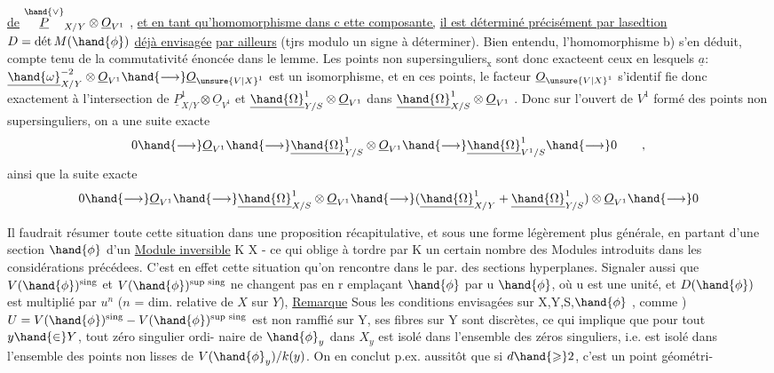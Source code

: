 
\uline{de} $\overset{\hand{\vee}}{\underline{P}}_{X/Y}\otimes\underline{O}_{V^1}$ , \uline{et en tant qu'homomorphisme dans c ette composante,}
\uline{il est déterminé précisément par lasedtion} $D = \text{dét}\,M(\hand{\phi})$ \uline{déjà envisagée}
\uline{par ailleurs} (tjrs modulo un signe à déterminer). Bien entendu,
l'homomorphisme b) s'en déduit, compte tenu de la commutativité énoncée
dans le lemme. Les points non supersinguliers$_{\text{x}}$ sont donc exacteent
ceux en lesquels $\underline{a}$: $\underline{\hand{\omega}}^{-2}_{X/Y}\otimes\underline{O}_{V^1}\hand{\longrightarrow}\underline{O}_{\unsure{V|X}^1}$ est un isomorphisme, et en
ces points,  le facteur $\underline{O}_{\unsure{V|X}^1}$ s'identif
fie donc exactement à l'intersection de $\underline{P}^1_{X/Y}\otimes\underline{O}_{V^1}$ et $\underline{\hand{\Omega}}^1_{Y/S}\otimes\underline{O}_{V^1}$
dans $\underline{\hand{\Omega}}^1_{X/S}\otimes\underline{O}_{V^1}$ . Donc sur l'ouvert de $V^1$ formé des points non
supersinguliers, on a une suite exacte
\[ 0\hand{\longrightarrow}\underline{O}_{V^1}\hand{\longrightarrow}\underline{\hand{\Omega}}^1_{Y/S}\otimes\underline{O}_{V^1}\hand{\longrightarrow}\underline{\hand{\Omega}}^1_{V^1/S}\hand{\longrightarrow} 0 \qquad , \]
ainsi que la suite exacte
\[ 0\hand{\longrightarrow}\underline{O}_{V^1}\hand{\longrightarrow}\underline{\hand{\Omega}}^1_{X/S}\otimes\underline{O}_{V^1}\hand{\longrightarrow}(\underline{\hand{\Omega}}^1_{X/Y}+\underline{\hand{\Omega}}^1_{Y/S})\otimes\underline{O}_{V^1}\hand{\longrightarrow} 0 \]

\placedmargin{$\|$} Il faudrait résumer  toute cette situation dans une proposition
récapitulative, et sous une forme légèrement plus générale, en partant
d'une section $\hand{\phi}$ d'un \uline{Module inversible}  K  X - ce qui oblige
à tordre par K un certain nombre des Modules introduits dans les
considérations précédees. C'est en effet  cette situation qu'on
rencontre  dans le par. des sections hyperplanes. Signaler aussi que
\placedmargin{|} $V(\hand{\phi})^{\text{sing}}$  et $V(\hand{\phi})^{\text{sup sing}}$ ne changent pas en r emplaçant $\hand{\phi}$ par u $\hand{\phi}$,
où u est une unité, 
et $D(\hand{\phi})$ est multiplié par $u^n$ ($n$ = dim. relative de $X$ sur $Y$),
\uline{Remarque} Sous les conditions envisagées sur X,Y,S,$\hand{\phi}$ , comme )
$U = V(\hand{\phi})^{\text{sing}}- V(\hand{\phi})^{\text{sup sing}}$ est non ramffié sur Y, ses fibres sur Y sont
discrètes, ce qui implique que pour tout $y\hand{\in} Y$, tout zéro singulier ordi-%
naire de $\hand{\phi}_y$ dans $X_y$ est isolé dans l'ensemble des zéros singuliers, 
i.e. est isolé dans l'ensemble des points non lisses de $V(\hand{\phi}_y)/k(y)$.
 On en conclut p.ex. aussitôt que si $d\hand{\geqslant} 2$, c'est un point géométri-%

